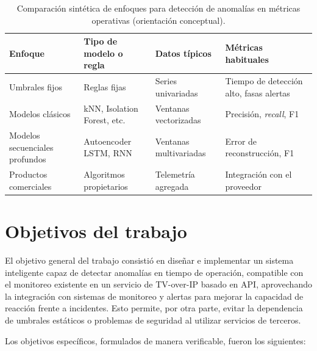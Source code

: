 \begin{table}[h]
\centering
\caption{Comparación sintética de enfoques para detección de anomalías en métricas operativas (orientación conceptual).}
\label{tab:comparativa-enfoques}
\begin{tabular}{@{}p{}p{}p{}p{}@{}}
\toprule
\textbf{Enfoque} & \textbf{Tipo de modelo o regla} & \textbf{Datos típicos} & \textbf{Métricas habituales} \\
\midrule
Umbrales fijos & Reglas fijas & Series univariadas & Tiempo de detección alto, fasas alertas \\
Modelos clásicos & kNN, Isolation Forest, etc. & Ventanas vectorizadas & Precisión, \textit{recall}, F1 \\
Modelos secuenciales profundos & Autoencoder LSTM, RNN & Ventanas multivariadas & Error de reconstrucción, F1 \\
Productos comerciales & Algoritmos propietarios & Telemetría agregada & Integración con el proveedor \\
\bottomrule
\end{tabular}
\end{table}

\section{Objetivos del trabajo}

El objetivo general del trabajo consistió en diseñar e implementar un sistema inteligente capaz de detectar anomalías en tiempo de operación, compatible con el monitoreo existente en un servicio de TV-over-IP basado en API, aprovechando la integración con sistemas de monitoreo y alertas para mejorar la capacidad de reacción frente a incidentes. Esto permite, por otra parte, evitar la dependencia de umbrales estáticos o problemas de seguridad al utilizar servicios de terceros.

Los objetivos específicos, formulados de manera verificable, fueron los siguientes:

